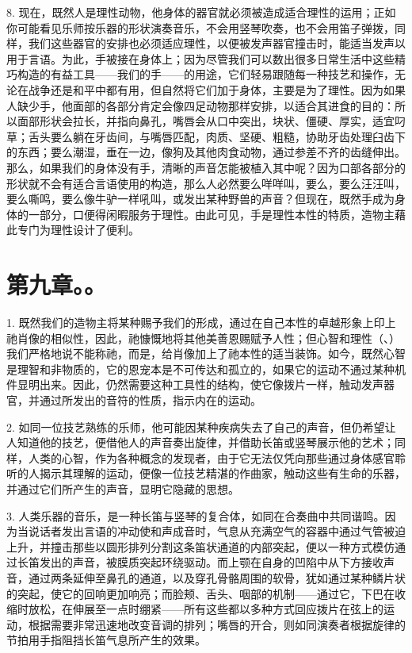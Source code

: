 8. 现在，既然人是理性动物，他身体的器官就必须被造成适合理性的运用；正如你可能看见乐师按乐器的形状演奏音乐，不会用竖琴吹奏，也不会用笛子弹拨，同样，我们这些器官的安排也必须适应理性，以便被发声器官撞击时，能适当发声以用于言语。为此，手被接在身体上；因为尽管我们可以数出很多日常生活中这些精巧构造的有益工具——我们的手——的用途，它们轻易跟随每一种技艺和操作，无论在战争还是和平中都有用，但自然将它们加于身体，主要是为了理性。因为如果人缺少手，他面部的各部分肯定会像四足动物那样安排，以适合其进食的目的：所以面部形状会拉长，并指向鼻孔，嘴唇会从口中突出，块状、僵硬、厚实，适宜叼草；舌头要么躺在牙齿间，与嘴唇匹配，肉质、坚硬、粗糙，协助牙齿处理臼齿下的东西；要么潮湿，垂在一边，像狗及其他肉食动物，通过参差不齐的齿缝伸出。那么，如果我们的身体没有手，清晰的声音怎能被植入其中呢？因为口部各部分的形状就不会有适合言语使用的构造，那么人必然要么咩咩叫，要么，要么汪汪叫，要么嘶鸣，要么像牛驴一样吼叫，或发出某种野兽的声音？但现在，既然手成为身体的一部分，口便得闲暇服务于理性。由此可见，手是理性本性的特质，造物主藉此专门为理性设计了便利。\par


\section{第九章。。}

1. 既然我们的造物主将某种赐予我们的形成，通过在自己本性的卓越形象上印上祂肖像的相似性，因此，祂慷慨地将其他美善恩赐赋予人性；但心智和理性（、）我们严格地说不能称祂，而是，给肖像加上了祂本性的适当装饰。如今，既然心智是理智和非物质的，它的恩宠本是不可传达和孤立的，如果它的运动不通过某种机件显明出来。因此，仍然需要这种工具性的结构，使它像拨片一样，触动发声器官，并通过所发出的音符的性质，指示内在的运动。\par

2. 如同一位技艺熟练的乐师，他可能因某种疾病失去了自己的声音，但仍希望让人知道他的技艺，便借他人的声音奏出旋律，并借助长笛或竖琴展示他的艺术；同样，人类的心智，作为各种概念的发现者，由于它无法仅凭向那些通过身体感官聆听的人揭示其理解的运动，便像一位技艺精湛的作曲家，触动这些有生命的乐器，并通过它们所产生的声音，显明它隐藏的思想。\par

3. 人类乐器的音乐，是一种长笛与竖琴的复合体，如同在合奏曲中共同谐鸣。因为当说话者发出言语的冲动使和声成音时，气息从充满空气的容器中通过气管被迫上升，并撞击那些以圆形排列分割这条笛状通道的内部突起，便以一种方式模仿通过长笛发出的声音，被膜质突起环绕驱动。而上颚在自身的凹陷中从下方接收声音，通过两条延伸至鼻孔的通道，以及穿孔骨骼周围的软骨，犹如通过某种鳞片状的突起，使它的回响更加响亮；而脸颊、舌头、咽部的机制——通过它，下巴在收缩时放松，在伸展至一点时绷紧——所有这些都以多种方式回应拨片在弦上的运动，根据需要非常迅速地改变音调的排列；嘴唇的开合，则如同演奏者根据旋律的节拍用手指阻挡长笛气息所产生的效果。\par

